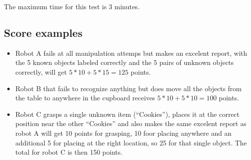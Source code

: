 
The maximum time for this test is 3 minutes.

\begin{scorelist}





	

	
\end{scorelist}

\subsection{Score examples} 
\begin{itemize}
 \item Robot A fails at all manipulation attemps but makes an excelent report, with the 5 known objects labeled correctly and the 5 pairs of unknown objects correctly, will get 
$5*10 + 5*15 = 125$ points. 
 \item Robot B that fails to recognize anything but does move all the objects from the table to anywhere in the cupboard receives $5*10 + 5*10 = 100$ points.
 \item Robot C grasps a single unknown item (``Cookies''), places it at the correct position near the other ``Cookies'' and also makes the same excelent report as robot A will get 
10 points for grasping, 10 foor placing anywhere and an additional 5 for placing at the right location, so 25 for that single object.
The  total for robot C is then 150 points.
\end{itemize} 


